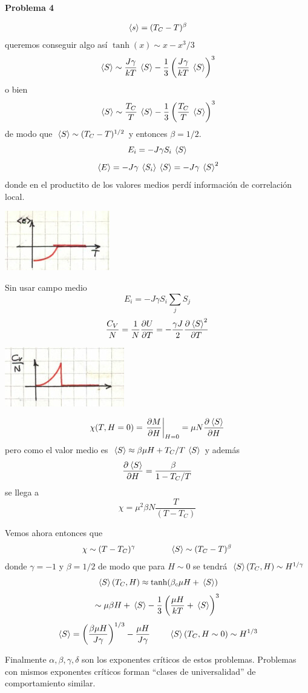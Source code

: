 \documentclass[10pt,oneside]{CBFT_book}
\begin{document}
\begin{ejemplo}{\bf Problema 4}

\[
	\vm{s} = (T_C - T)^\beta
\]
queremos conseguir algo así $\tanh(x) \sim x - x^3/3 $
\[
	\vm{S} \sim \frac{J \gamma}{kT} \vm{S} - \frac{1}{3} \left( \frac{J \gamma}{kT} \vm{S}\right)^3
\]
o bien
\[
	\vm{S} \sim \frac{T_C}{T} \vm{S} - \frac{1}{3} \left( \frac{T_C}{T} \vm{S}\right)^3
\]
de modo que $ \vm{S} \sim ( T_C - T )^{1/2}$ y entonces $\beta = 1/2 $.
\[
	E_i = - J \gamma S_i \vm{S}
\]
\[
	\vm{E} = - J \gamma \vm{S_i} \vm{S} = - J \gamma \vm{S}^2
\]
donde en el productito de los valores medios perdí información de correlación local.

\includegraphics[scale=0.5]{images/1606337175.jpg}

Sin usar campo medio 
\[
	E_i = - J \gamma S_i \sum_j S_j
\]
\[
	\frac{C_V}{N} = \frac{1}{N} \dpar{U}{T} = - \frac{\gamma J}{2} \dpar{\vm{S}^2}{T}
\]

\includegraphics[scale=0.5]{images/1606337180.jpg}

\[
	\chi(T,H=0) = \dpare{M}{H}{H=0} = \mu N \dpar{\vm{S}}{H}
\]
pero como el valor medio es $\vm{S} \approx \beta \mu H + T_C/T \vm{S}$ y además
\[
	\dpar{\vm{S}}{H} = \frac{\beta}{1 - T_C/T}
\]
se llega a
\[
	\chi = \mu^2 \beta N \frac{ T }{( T - T_C )}
\]


Vemos ahora entonces que 
\[
	\chi \sim (T-T_C)^\gamma \qquad \qquad 
	\vm{S} \sim (T_C -T)^\beta
\]
donde $\gamma=-1$ y $\beta=1/2$ de modo que para $H\sim 0$ se tendrá $\vm{S}(T_C,H) \sim H^{1/\gamma}$
\[
	\vm{S}(T_C,H) \approx \tanh( \beta_c \mu H + \vm{S} )
\]
\[
	\sim \mu \beta H + \vm{S} - \frac{1}{3} \left( \frac{\mu H}{kT} + \vm{S} \right)^3
\]
\[
	\vm{S} = \Frac{\beta\mu H}{J\gamma}^{1/3} - \frac{\mu H}{J\gamma} \qquad 
	\vm{S}(T_C,H\sim 0) \sim H^{1/3}
\]

Finalmente $\alpha,\beta,\gamma,\delta$ son los exponentes críticos de estos problemas.
Problemas con mismos exponentes críticos forman ``clases de universalidad'' de comportamiento similar.
 
\end{ejemplo}
\end{document}

